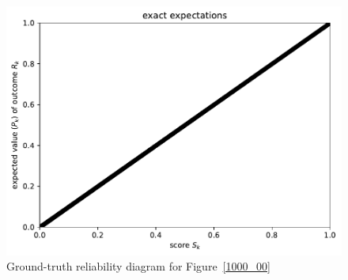 \documentclass{article}
\begin{document}
\begin{figure}
\begin{centering}

\parbox{\imsize}{\includegraphics[width=\imsize]
                {./codes/unweighted/1000_10_1_3/exact.pdf}}

\end{centering}
\caption{Ground-truth reliability diagram for Figure~\ref{1000_00}}
\label{1000_00e}
\end{figure}
\end{document}
